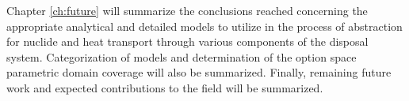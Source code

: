 Chapter \ref{ch:future} will summarize the conclusions reached 
concerning the appropriate analytical and detailed models to utilize 
in the process of abstraction for nuclide and heat transport through 
various components of the disposal system. Categorization of models 
and determination of the option space parametric domain coverage will 
also be summarized. Finally, remaining future work and expected 
contributions to the field will be summarized. 
